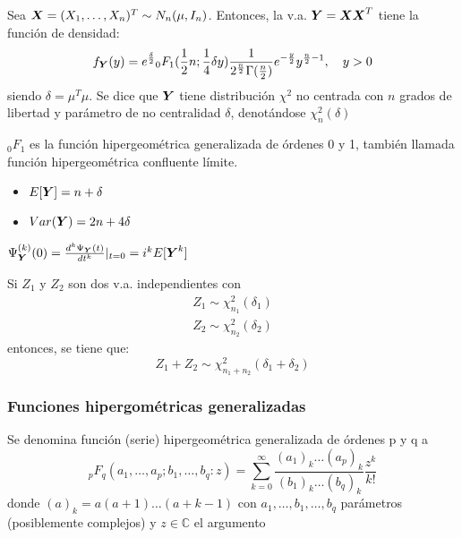 \begin{ndef}
  Sea $\boldsymbol{X} = (X_1,\dots,X_n)^T\sim N_n(\mu,I_n)$. Entonces, la v.a. $\boldsymbol{Y} = \boldsymbol{X} \boldsymbol{X}^T$ tiene la función de densidad:
  \[
f_{\boldsymbol{Y}}(y) = e^{\frac{\delta}{2}} {}_0 F_1(\frac{1}{2}n; \frac{1}{4}\delta y) \frac{1}{2^{\frac{n}{2}} \Gamma(\frac{n}{2})} e^{-\frac{y}{2}} y^{\frac{n}{2} - 1}, \quad y > 0
\]
siendo $\delta = \mu^T \mu$. Se dice que $\boldsymbol{Y}$ tiene distribución $\chi^2$ no centrada con $n$ grados de libertad y parámetro de no centralidad $\delta$, denotándose $\chi_n^2(\delta)$
\end{ndef}

\begin{nota}
${}_0F_1$ es la función hipergeométrica generalizada de órdenes 0 y 1, también llamada función hipergeométrica confluente límite.
\end{nota}

\begin{nprop}
  \begin{itemize}
  \item $E[\boldsymbol{Y}] = n+\delta$
  \item $Var(\boldsymbol{Y}) = 2n + 4\delta$
    \end{itemize}
\end{nprop}
\begin{nota}
$\Psi_{\boldsymbol{Y}} ^{(k)}(0) = \frac{d^k \Psi_{\boldsymbol{Y}}(t)}{dt^k}|_{t= 0} = i^k E[\boldsymbol{Y}^k]$
\end{nota}

\begin{nprop}
  Si $Z_1$ y $Z_2$ son dos v.a. independientes con
  \begin{align}Z_1 \sim \chi_{n_1}^2(\delta_1) \\
    Z_2 \sim \chi_{n_2}^2 (\delta_2)
  \end{align}
  entonces, se tiene que:
  \[
 Z_1 + Z_2 \sim \chi_{n_1+n_2}^2 (\delta_1 + \delta_2)
  \]
\end{nprop}

\subsubsection{Funciones hipergométricas generalizadas}

\begin{ndef}
 
  Se denomina función (serie) hipergeométrica generalizada de órdenes p y q a
  \[
{}_pF_q(a_1,\dots,a_p;b_1,\dots,b_q:z) = \sum_{k = 0}^\infty \frac{(a_1)_k \dots (a_p)_k}{(b_1)_k \dots (b_q)_k} \frac{z^k}{k!}
\]
donde $(a)_k = a(a+1)\dots(a+k-1)$ con $a_1,\dots,b_1,\dots,b_q$ parámetros (posiblemente complejos) y $z\in \mathbb C$ el argumento
\end{ndef}

